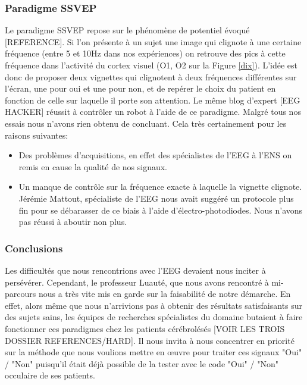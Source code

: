 \documentclass[11pt,a4paper]{article}
\theoremstyle{plain}
\theoremstyle{definition}
\begin{document}
\subsubsection{Paradigme SSVEP}

Le paradigme SSVEP repose sur le phénomène de potentiel évoqué [REFERENCE]. Si l'on présente à un sujet une image qui clignote à une certaine fréquence (entre 5 et 10Hz dans nos expériences) on retrouve 
des pics à cette fréquence dans l'activité du cortex visuel (O1, O2 sur la Figure \ref{dix}). L'idée est donc de proposer deux vignettes qui clignotent à deux fréquences différentes sur l'écran, une pour
oui et une pour non, et de repérer le choix du patient en fonction de celle sur laquelle il porte son attention. Le même blog d'expert [EEG HACKER] réussit à contrôler un robot à l'aide de ce paradigme.
Malgré tous nos essais nous n'avons rien obtenu de concluant. Cela très certainement pour les raisons suivantes:

\begin{itemize}
\item Des problèmes d'acquisitions, en effet des spécialistes de l'EEG à l'ENS on remis en cause la qualité de nos signaux.
\item Un manque de contrôle sur la fréquence exacte à laquelle la vignette clignote. Jérémie Mattout, spécialiste de l'EEG nous avait suggéré un protocole
plus fin pour se débarasser de ce biais à l'aide d'électro-photodiodes. Nous n'avons pas réussi à aboutir non plus.
\end{itemize}

\subsubsection{Conclusions}

Les difficultés que nous rencontrions avec l'EEG devaient nous inciter à persévérer. Cependant, le professeur Luauté, que nous avons rencontré à mi-parcours nous a très vite 
mis en garde sur la faisabilité de notre démarche. En effet, alors même que nous n'arrivions pas à obtenir des résultats satisfaisants sur des sujets sains, les équipes de recherches spécialistes 
du domaine butaient à faire fonctionner ces paradigmes chez les patients cérébrolésés [VOIR LES TROIS DOSSIER REFERENCES/HARD]. Il nous invita à nous concentrer en priorité sur la méthode que nous 
voulions mettre en \oe uvre pour traiter ces signaux "Oui" / "Non" puisqu'il était déjà possible de la tester avec le code "Oui" / "Non" occulaire de ses patients. 
\end{document}
